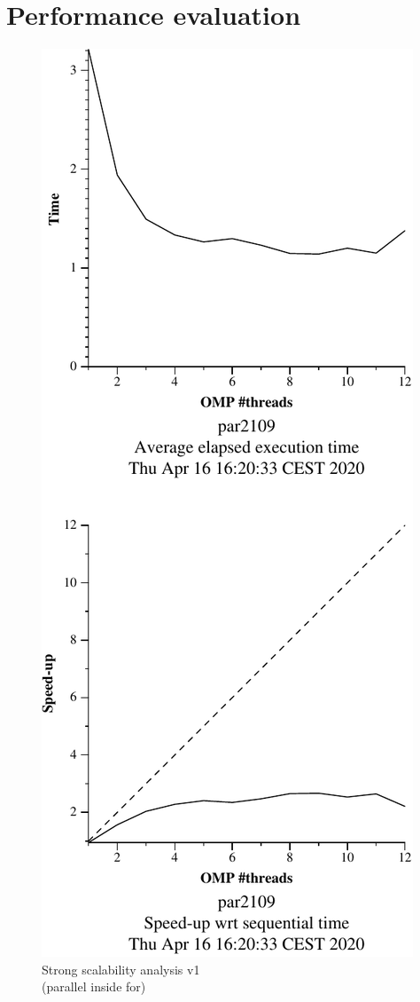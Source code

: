 \section{Performance evaluation}%
\label{sec:Performance evaluation}



\begin{figure}[H]
    \begin{minipage}{0.5\textwidth}
        \centering
        \includegraphics[width=0.7\linewidth]{plots/v1-crop.pdf}
        \caption{Strong scalability analysis v1 \\ (parallel inside for)}

\end{minipage}
\end{figure}
